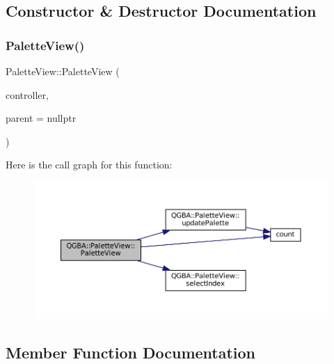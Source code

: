 \subsection{Constructor \& Destructor Documentation}
\mbox{\label{class_q_g_b_a_1_1_palette_view_a79c74a1bfa468f32bc179dbc97d232ed}} 
\subsubsection{\texorpdfstring{Palette\+View()}{PaletteView()}}
{\footnotesize\ttfamily Palette\+View\+::\+Palette\+View (\begin{DoxyParamCaption}\item[{std\+::shared\+\_\+ptr$<$ \mbox{\hyperlink{class_q_g_b_a_1_1_core_controller}{Core\+Controller}} $>$}]{controller,  }\item[{Q\+Widget $\ast$}]{parent = {\ttfamily nullptr} }\end{DoxyParamCaption})}

Here is the call graph for this function\+:
\nopagebreak
\begin{figure}[H]
\begin{center}
\leavevmode
\includegraphics[width=350pt]{class_q_g_b_a_1_1_palette_view_a79c74a1bfa468f32bc179dbc97d232ed_cgraph}
\end{center}
\end{figure}


\subsection{Member Function Documentation}
\mbox{\label{class_q_g_b_a_1_1_palette_view_abcbc4ec67cdb645a624f559379c86d37}} 
